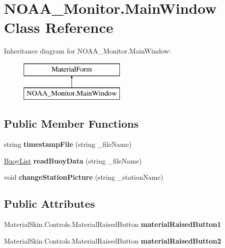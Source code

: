 \hypertarget{class_n_o_a_a___monitor_1_1_main_window}{}\section{N\+O\+A\+A\+\_\+\+Monitor.\+Main\+Window Class Reference}
\label{class_n_o_a_a___monitor_1_1_main_window}
Inheritance diagram for N\+O\+A\+A\+\_\+\+Monitor.\+Main\+Window\+:\begin{figure}[H]
\begin{center}
\leavevmode
\includegraphics[height=2.000000cm]{class_n_o_a_a___monitor_1_1_main_window}
\end{center}
\end{figure}
\subsection*{Public Member Functions}
\begin{DoxyCompactItemize}
\item 
\mbox{\label{class_n_o_a_a___monitor_1_1_main_window_a28afa0207b2f097c7cb2c7a897b0715e}} 
string {\bfseries timestamp\+File} (string \+\_\+file\+Name)
\item 
\mbox{\label{class_n_o_a_a___monitor_1_1_main_window_a482faa4bc10f2e2ec72efca039a404bc}} 
\mbox{\hyperlink{class_buoy_list}{Buoy\+List}} {\bfseries read\+Buoy\+Data} (string \+\_\+file\+Name)
\item 
\mbox{\label{class_n_o_a_a___monitor_1_1_main_window_ab95ce7dd370e11ff7f4e4234bfd6f87b}} 
void {\bfseries change\+Station\+Picture} (string \+\_\+station\+Name)
\end{DoxyCompactItemize}
\subsection*{Public Attributes}
\begin{DoxyCompactItemize}
\item 
\mbox{\label{class_n_o_a_a___monitor_1_1_main_window_abb42cf322b24155ae50b85f9132dbe26}} 
Material\+Skin.\+Controls.\+Material\+Raised\+Button {\bfseries material\+Raised\+Button1}
\item 
\mbox{\label{class_n_o_a_a___monitor_1_1_main_window_a5e7a69258252e7d3a865e6b2ecf7c61c}} 
Material\+Skin.\+Controls.\+Material\+Raised\+Button {\bfseries material\+Raised\+Button2}
\end{DoxyCompactItemize}
